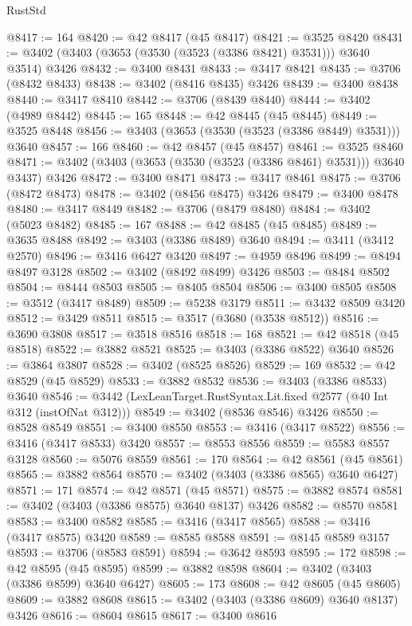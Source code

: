\begin{lexlean}{RustStd}
\begin{coremodule}
@8417 := 164
@8420 := @42 @8417 (@45 @8417)
@8421 := @3525 @8420
@8431 := @3402 (@3403 (@3653 (@3530 (@3523 (@3386 @8421) @3531))) @3640 @3514) @3426
@8432 := @3400 @8431
@8433 := @3417 @8421
@8435 := @3706 (@8432 @8433)
@8438 := @3402 (@8416 @8435) @3426
@8439 := @3400 @8438
@8440 := @3417 @8410
@8442 := @3706 (@8439 @8440)
@8444 := @3402 (@4989 @8442)
@8445 := 165
@8448 := @42 @8445 (@45 @8445)
@8449 := @3525 @8448
@8456 := @3403 (@3653 (@3530 (@3523 (@3386 @8449) @3531))) @3640
@8457 := 166
@8460 := @42 @8457 (@45 @8457)
@8461 := @3525 @8460
@8471 := @3402 (@3403 (@3653 (@3530 (@3523 (@3386 @8461) @3531))) @3640 @3437) @3426
@8472 := @3400 @8471
@8473 := @3417 @8461
@8475 := @3706 (@8472 @8473)
@8478 := @3402 (@8456 @8475) @3426
@8479 := @3400 @8478
@8480 := @3417 @8449
@8482 := @3706 (@8479 @8480)
@8484 := @3402 (@5023 @8482)
@8485 := 167
@8488 := @42 @8485 (@45 @8485)
@8489 := @3635 @8488
@8492 := @3403 (@3386 @8489) @3640
@8494 := @3411 (@3412 @2570)
@8496 := @3416 @6427 @3420
@8497 := @4959 @8496
@8499 := @8494 @8497 @3128
@8502 := @3402 (@8492 @8499) @3426
@8503 := @8484 @8502
@8504 := @8444 @8503
@8505 := @8405 @8504
@8506 := @3400 @8505
@8508 := @3512 (@3417 @8489)
@8509 := @5238 @3179
@8511 := @3432 @8509 @3420
@8512 := @3429 @8511
@8515 := @3517 (@3680 (@3538 @8512))
@8516 := @3690 @3808
@8517 := @3518 @8516
@8518 := 168
@8521 := @42 @8518 (@45 @8518)
@8522 := @3882 @8521
@8525 := @3403 (@3386 @8522) @3640
@8526 := @3864 @3807
@8528 := @3402 (@8525 @8526)
@8529 := 169
@8532 := @42 @8529 (@45 @8529)
@8533 := @3882 @8532
@8536 := @3403 (@3386 @8533) @3640
@8546 := @3442 (LexLeanTarget.RustSyntax.Lit.fixed @2577 (@40 Int @312 (instOfNat @312)))
@8549 := @3402 (@8536 @8546) @3426
@8550 := @8528 @8549
@8551 := @3400 @8550
@8553 := @3416 (@3417 @8522)
@8556 := @3416 (@3417 @8533) @3420
@8557 := @8553 @8556
@8559 := @5583 @8557 @3128
@8560 := @5076 @8559
@8561 := 170
@8564 := @42 @8561 (@45 @8561)
@8565 := @3882 @8564
@8570 := @3402 (@3403 (@3386 @8565) @3640 @6427)
@8571 := 171
@8574 := @42 @8571 (@45 @8571)
@8575 := @3882 @8574
@8581 := @3402 (@3403 (@3386 @8575) @3640 @8137) @3426
@8582 := @8570 @8581
@8583 := @3400 @8582
@8585 := @3416 (@3417 @8565)
@8588 := @3416 (@3417 @8575) @3420
@8589 := @8585 @8588
@8591 := @8145 @8589 @3157
@8593 := @3706 (@8583 @8591)
@8594 := @3642 @8593
@8595 := 172
@8598 := @42 @8595 (@45 @8595)
@8599 := @3882 @8598
@8604 := @3402 (@3403 (@3386 @8599) @3640 @6427)
@8605 := 173
@8608 := @42 @8605 (@45 @8605)
@8609 := @3882 @8608
@8615 := @3402 (@3403 (@3386 @8609) @3640 @8137) @3426
@8616 := @8604 @8615
@8617 := @3400 @8616

\end{coremodule}
\end{lexlean}

